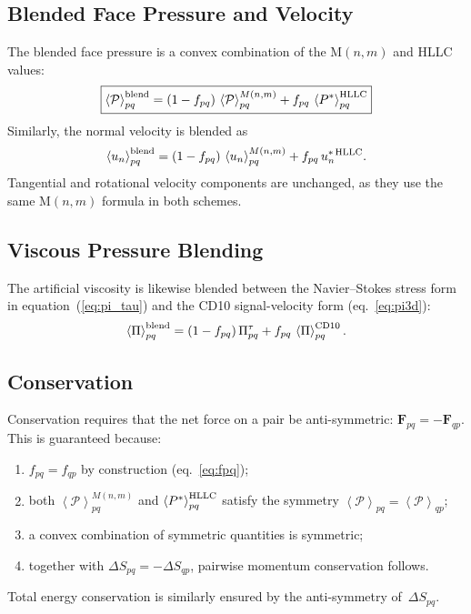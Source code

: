 \documentclass[twocolumn]{aastex63}
\newcommand{\vel}{{u}}
\newcommand{\surf}[0]{S}
\newcommand{\pressure}[0]{\mathcal{P}}
\begin{document}
\subsection{Blended Face Pressure and Velocity}

The blended face pressure is a convex combination of
the M$(n,m)$ and HLLC values:
\begin{equation}\label{eq:pblend}
  \boxed{
  \left<\pressure\right>_{pq}^{\rm blend}
  = (1 - f_{pq})\,\left<\pressure\right>_{pq}^{M(n,m)}
  + f_{pq}\,\left<P^*\right>_{pq}^{\rm HLLC}
  }
\end{equation}
Similarly, the normal velocity is blended as
\begin{equation}\label{eq:vblend}
  \left<\vel_n\right>_{pq}^{\rm blend}
  = (1 - f_{pq})\,\left<\vel_n\right>_{pq}^{M(n,m)}
  + f_{pq}\,\vel_n^{*\,\rm HLLC}.
\end{equation}
Tangential and rotational velocity components are
unchanged, as they use the same M$(n,m)$ formula in
both schemes.

\subsection{Viscous Pressure Blending}

The artificial viscosity is likewise blended between
the Navier--Stokes stress form in equation~(\ref{eq:pi_tau}) and the CD10
signal-velocity form (eq.~\ref{eq:pi3d}):
\begin{equation}\label{eq:piblend}
  \left<\Pi\right>_{pq}^{\rm blend}
  = (1 - f_{pq})\,\Pi_{pq}^{\tau}
  + f_{pq}\,\left<\Pi\right>_{pq}^{\rm CD10}.
\end{equation}

\subsection{Conservation}

Conservation requires that the net force on a pair
be anti-symmetric: $\boldsymbol{F}_{pq} = -\boldsymbol{F}_{qp}$.
This is guaranteed because:
\begin{enumerate}[label=(\roman*)]
  \item $f_{pq} = f_{qp}$ by construction
    (eq.~\ref{eq:fpq});
  \item both $\left<\pressure\right>_{pq}^{M(n,m)}$
    and $\left<P^*\right>_{pq}^{\rm HLLC}$ satisfy
    the symmetry
    $\left<\pressure\right>_{pq}
     = \left<\pressure\right>_{qp}$;
  \item a convex combination of symmetric quantities
    is symmetric;
  \item together with $\Delta\surf_{pq} = -\Delta\surf_{qp}$,
    pairwise momentum conservation follows.
\end{enumerate}
Total energy conservation is similarly ensured by the
anti-symmetry of~$\Delta\surf_{pq}$.
\end{document}
